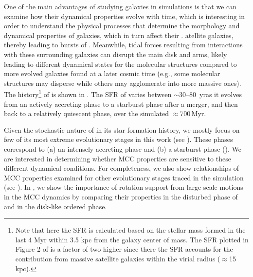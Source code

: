 \IfFileExists{emulateapjlegacy.cls}{\documentclass[iop]{emulateapjlegacy}}{\documentclass[iop]{emulateapj}}
\begin{document}
One of the main advantages of studying galaxies in simulations is that we can examine how their dynamical properties evolve with time, which
is interesting in order to understand the physical processes that determine the morphology and dynamical properties of galaxies, which in turn affect their \SF.
%
atellite galaxies, thereby leading to bursts of \SF. Meanwhile, tidal forces resulting from interactions with these surrounding galaxies can disrupt the main disk and arms, likely leading to different dynamical states for the molecular structures compared to more evolved galaxies found at a later cosmic time (e.g., some molecular structures may disperse while others may agglomerate into more massive ones). %
The \SF history\footnote{Note that here the SFR is calculated based on the stellar mass formed in the last 4 Myr within 3.5 kpc from the galaxy center of mass. The SFR plotted in Figure 2 of \citet{Pallottini17b} is a factor of two higher since there the SFR accounts for the contribution from massive satellite galaxies within the virial radius ($\approx$15\,kpc).} of \flower is shown in . The SFR of \flower varies between $\sim$30--80 \Msun\,yr\pmOne as it evolves from an actively accreting phase to a starburst phase after a merger, and then back to a relatively quiescent phase, over the simulated $\approx 700$\,Myr.

Given the stochastic nature of \flower in its star formation history, we mostly focus on few of its most extreme evolutionary stages in this work (see ).
%
These phases correspond to (a) an intensely accreting phase and (b) a starburst phase (). We are interested in determining whether MCC properties are sensitive to these different dynamical conditions. For completeness, we also show relationships of MCC properties examined for other evolutionary stages traced in the simulation (see ).
In , we show the importance of rotation support from large-scale motions in the MCC dynamics 
by comparing their properties in the disturbed phase of \flower and in the disk-like ordered phase.
\end{document}
